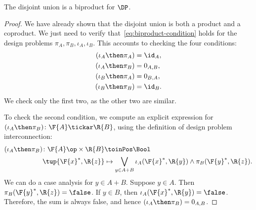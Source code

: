 \begin{lemma}
The disjoint union is a biproduct for $\DP$.
\end{lemma}
\begin{proof}
    We have already shown that the disjoint union is both
    a product and a coproduct. We just need to verify that~\cref{eq:biproduct-condition} holds
    for the design problems $\pi_A, \pi_B, \iota_A, \iota_B$.
    This accounts to checking the four conditions:
    \begin{equation}
    \begin{aligned}
        (\iota_A\then \pi_A) &= \id_{A}, \\
        (\iota_A\then \pi_B) &= 0_{A,B}, \\
        (\iota_B\then \pi_A) &= 0_{B,A},\\
        (\iota_B\then \pi_B) &= \id_{B}.
    \end{aligned}
    \end{equation}
    We check only the first two, as the other two are similar.

    To check the second condition, we compute an explicit expression for $(\iota_A\then \pi_B)\colon \F{A} \tickar \R{B}$, using the definition
    of design problem interconnection:
    \begin{equation}
    \begin{aligned}
        (\iota_A\then \pi_B) \colon  \F{A}\op\times \R{B} & \toinPos \Bool \\
                            \tup{\F{x}^*, \R{z}} &\mapsto
                            \bigvee_{y \in A + B} \iota_A(\F{x}^*,\R{y}) \wedge \pi_B(\F{y}^*,\R{z}).
    \end{aligned}
    \end{equation}
    We can do a case analysis for $y\in A+B$. Suppose $y\in A$.
    Then $\pi_B(\F{y}^*,\R{z}) = \false$. If $y \in B$, then $\iota_A(\F{x}^*,\R{y}) = \false$.
    Therefore, the sum is always false, and hence $(\iota_A\then \pi_B) = 0_{A,B}$.


\end{proof}
